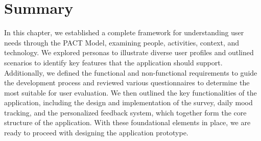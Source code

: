 \section{Summary}

In this chapter, we established a complete framework for understanding user needs through the PACT Model, examining people, activities, context, and technology. We explored personas to illustrate diverse user profiles and outlined scenarios to identify key features that the application should support. Additionally, we defined the functional and non-functional requirements to guide the development process and reviewed various questionnaires to determine the most suitable for user evaluation. We then outlined the key functionalities of the application, including the design and implementation of the survey, daily mood tracking, and the personalized feedback system, which together form the core structure of the application. With these foundational elements in place, we are ready to proceed with designing the application prototype.